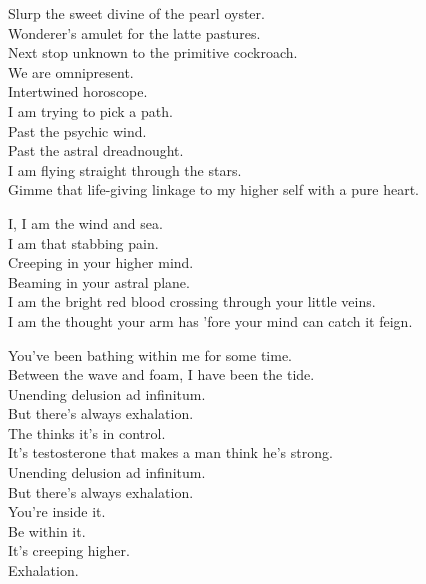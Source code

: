 
Slurp the sweet divine of the pearl oyster. \\
Wonderer's amulet for the latte pastures. \\
Next stop unknown to the primitive cockroach. \\
We are omnipresent. \\
Intertwined horoscope. \\

I am trying to pick a path. \\
Past the psychic wind. \\
Past the astral dreadnought. \\
I am flying straight through the stars. \\
Gimme that life-giving linkage to my higher self with a pure heart. \\


I, I am the wind and sea. \\
I am that stabbing pain. \\
Creeping in your higher mind. \\
Beaming in your astral plane. \\
I am the bright red blood crossing through your little veins. \\
I am the thought your arm has 'fore your mind can catch it feign. \\


You've been bathing within me for some time. \\
Between the wave and foam, I have been the tide. \\
Unending delusion ad infinitum. \\
But there's always exhalation. \\
The  thinks it's in control. \\
It's testosterone that makes a man think he's strong. \\
Unending delusion ad infinitum. \\
But there's always exhalation. \\

You're inside it. \\
Be within it. \\
It's creeping higher. \\
Exhalation. \\

